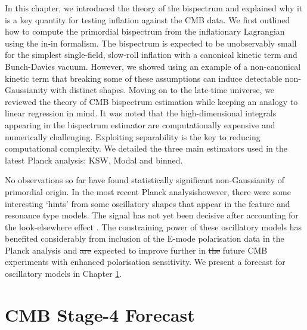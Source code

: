 \documentclass[a4paper,12pt,times,custombib,print,index]{Classes/PhDThesisPSnPDF} %
\providecommand{\DIFadd}[1]{{\protect\color{blue}\uwave{#1}}} %
\providecommand{\DIFdel}[1]{{\protect\color{red}\sout{#1}}}                      %
\providecommand{\DIFaddbegin}{} %
\providecommand{\DIFaddend}{} %
\providecommand{\DIFdelbegin}{} %
\providecommand{\DIFdelend}{} %
\newcommand{\DIFscaledelfig}{0.5}
\newlength{\DIFdelgraphicswidth} %
\newlength{\DIFdelgraphicsheight} %
\newcommand{\DIFaddincludegraphics}[2][]{{\color{blue}\fbox{\DIFOincludegraphics[#1]{#2}}}} %
\newcommand{\DIFdelincludegraphics}[2][]{%
\sbox{\DIFdelgraphicsbox}{\DIFOincludegraphics[#1]{#2}}%
\settoboxwidth{\DIFdelgraphicswidth}{\DIFdelgraphicsbox} %
\settoboxtotalheight{\DIFdelgraphicsheight}{\DIFdelgraphicsbox} %
\scalebox{\DIFscaledelfig}{%
\parbox[b]{\DIFdelgraphicswidth}{\usebox{\DIFdelgraphicsbox}\\[-\baselineskip] \rule{\DIFdelgraphicswidth}{0em}}\llap{\resizebox{\DIFdelgraphicswidth}{\DIFdelgraphicsheight}{%
\setlength{\unitlength}{\DIFdelgraphicswidth}%
\begin{picture}(1,1)%
\thicklines\linethickness{2pt} %
{\color[rgb]{1,0,0}\put(0,0){\framebox(1,1){}}}%
{\color[rgb]{1,0,0}\put(0,0){\line( 1,1){1}}}%
{\color[rgb]{1,0,0}\put(0,1){\line(1,-1){1}}}%
\end{picture}%
}\hspace*{3pt}}} %
} %
\DeclareRobustCommand{\DIFaddbegin}{\DIFOaddbegin \let\includegraphics\DIFaddincludegraphics} %
\DeclareRobustCommand{\DIFaddend}{\DIFOaddend \let\includegraphics\DIFOincludegraphics} %
\DeclareRobustCommand{\DIFdelbegin}{\DIFOdelbegin \let\includegraphics\DIFdelincludegraphics} %
\DeclareRobustCommand{\DIFdelend}{\DIFOaddend \let\includegraphics\DIFOincludegraphics} %
\begin{document}
In this chapter, we introduced the theory of the bispectrum and explained why it is a key quantity for testing inflation against the CMB data. We first outlined how to compute the primordial bispectrum from the inflationary Lagrangian using the in-in formalism. The bispectrum is expected to be unobservably small for the simplest single-field, slow-roll inflation with a canonical kinetic term and Bunch-Davies vacuum. However, we showed using an example of a non-canonical kinetic term that breaking some of these assumptions can induce detectable non-Gaussianity with distinct shapes. Moving on to the late-time universe, we reviewed the theory of CMB bispectrum estimation while keeping an analogy to linear regression in mind. It was noted that the high-dimensional integrals appearing in the bispectrum estimator are computationally expensive and numerically challenging. Exploiting separability is the key to reducing computational complexity. We detailed the three main estimators used in the latest Planck analysis: KSW, Modal and binned.

No observations so far have found statistically significant non-Gaussianity of primordial origin. In the most recent Planck analysis\DIFaddbegin \DIFadd{, }\DIFaddend however, there were some interesting `hints' from some oscillatory shapes that appear in the feature and resonance type models. The signal has not yet been decisive after accounting for the look-elsewhere effect \cite{Fergusson2015b,PlanckCollaboration2018}. The constraining power of these oscillatory models has benefited considerably from \DIFaddbegin \DIFadd{the }\DIFaddend inclusion of the E-mode polarisation data in the Planck analysis and \DIFdelbegin \DIFdel{are }\DIFdelend \DIFaddbegin \DIFadd{is }\DIFaddend expected to improve further in \DIFdelbegin \DIFdel{the }\DIFdelend future CMB experiments with enhanced polarisation sensitivity. We present a forecast for oscillatory models in Chapter \ref{chapter:CMB_state-4_forecast}.
\clearpage{}
\clearpage{}\chapter{CMB Stage-4 Forecast}
\label{chapter:CMB_state-4_forecast}

\ifpdf
    \graphicspath{{Chapter4/Figs/Raster/}{Chapter4/Figs/PDF/}{Chapter4/Figs/}}
\else
    \graphicspath{{Chapter4/Figs/Vector/}{Chapter4/Figs/}}
\fi
\end{document}
